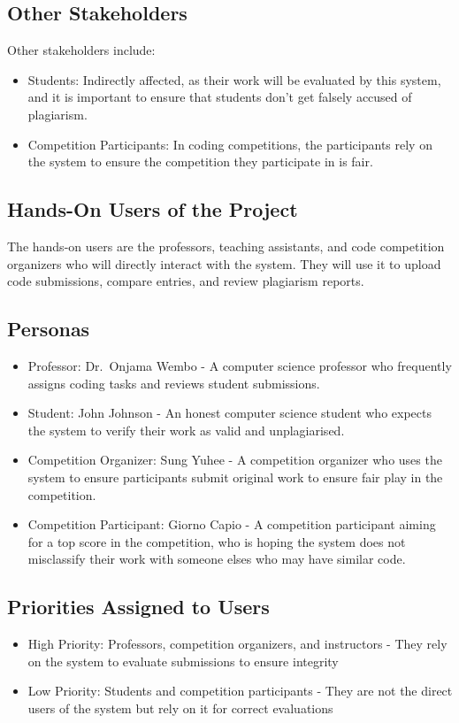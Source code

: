 \documentclass[12pt]{article}
\begin{document}
\subsection{Other Stakeholders}
Other stakeholders include:
\begin{itemize}
    \item Students: Indirectly affected, as their work will be evaluated by this
    system, and it is important to ensure that students don't get falsely accused
    of plagiarism.
    \item Competition Participants: In coding competitions, the participants
    rely on the system to ensure the competition they participate in is fair.
\end{itemize}

\subsection{Hands-On Users of the Project}
The hands-on users are the professors, teaching assistants, and code competition
organizers who will directly interact with the system. They will use it to
upload code submissions, compare entries, and review plagiarism reports.

\subsection{Personas}
\begin{itemize}
    \item Professor: Dr.\ Onjama Wembo - A computer science professor who
    frequently assigns coding tasks and reviews student submissions.
    \item Student: John Johnson - An honest computer science student who
    expects the system to verify their work as valid and unplagiarised.
    \item Competition Organizer: Sung Yuhee - A competition organizer who
    uses the system to ensure participants submit original work to ensure fair
    play in the competition.
    \item Competition Participant: Giorno Capio - A competition participant
    aiming for a top score in the competition, who is hoping the system does not
    misclassify their work with someone elses who may have similar code.
\end{itemize}

\subsection{Priorities Assigned to Users}
\begin{itemize}
    \item High Priority: Professors, competition organizers, and instructors -
    They rely on the system to evaluate submissions to ensure integrity
    \item Low Priority: Students and competition participants - They are not the
    direct users of the system but rely on it for correct evaluations
\end{itemize}
\end{document}
